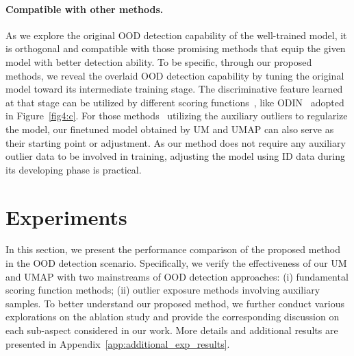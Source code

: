 \documentclass{article}
\theoremstyle{plain}
\theoremstyle{definition}
\theoremstyle{remark}
\begin{document}
\paragraph{Compatible with other methods.} As we explore the original OOD detection capability of the well-trained model, it is orthogonal and compatible with those promising methods that equip the given model with better detection ability. To be specific, through our proposed methods, we reveal the overlaid OOD detection capability by tuning the original model toward its intermediate training stage. 
The discriminative feature learned at that stage can be utilized by different scoring functions~\citep{huang2021importance,liu2020energy,sun2022dice}, like ODIN~\citep{LiangLS18} adopted in Figure~\ref{fig4:c}. For those methods~\citep{hendrycks2019using,liu2020energy, ming2022poem} utilizing the auxiliary outliers to regularize the model, our finetuned model obtained by UM and UMAP can also serve as their starting point or adjustment. As our method does not require any auxiliary outlier data to be involved in training, adjusting the model using ID data during its developing phase is practical.




\section{Experiments}
\label{sec:exp}

In this section, we present the performance comparison of the proposed method in the OOD detection scenario. Specifically, we verify the effectiveness of our UM and UMAP with two mainstreams of OOD detection approaches: (i) fundamental scoring function methods; (ii) outlier exposure methods involving auxiliary samples. To better understand our proposed method, we further conduct various explorations on the ablation study and provide the corresponding discussion on each sub-aspect considered in our work. More details and additional results are presented in Appendix~\ref{app:additional_exp_results}.
\end{document}
